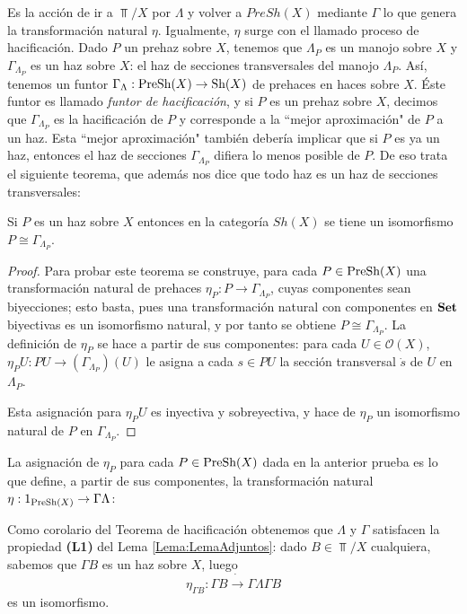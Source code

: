Es la acción de ir a $\Top/X$ por $\Lambda$ y volver a $PreSh(X)$ mediante $\Gamma$ lo que genera la transformación natural $\eta$. Igualmente, $\eta$ surge con el llamado proceso de hacificación. Dado $P$ un prehaz sobre $X$, tenemos que $\Lambda_P$ es un manojo sobre $X$ y $\Gamma_{\Lambda_P}$ es un haz sobre $X$: el haz de secciones transversales del manojo $\Lambda_P$. Así, tenemos un funtor $\Gamma_\Lambda: \normalfont{\text{PreSh}}(X)\to\normalfont{\text{Sh}}(X)$ de prehaces en haces sobre $X$. Éste funtor es llamado \textit{funtor de hacificación}, y si $P$ es un prehaz sobre $X$, decimos que $\Gamma_{\Lambda_P}$ es la hacificación de $P$ y corresponde a la ``mejor aproximación" de $P$ a un haz. Esta ``mejor aproximación" también debería implicar que si $P$ es ya un haz, entonces el haz de secciones $\Gamma_{\Lambda_P}$ difiera lo menos posible de $P$. De eso trata el siguiente teorema, que además nos dice que todo haz es un haz de secciones transversales:
\begin{Tma}
   Si $P$ es un haz sobre $X$ entonces en la categoría $Sh(X)$ se tiene un isomorfismo $P\cong \Gamma_{\Lambda_P}$.
\end{Tma}
\begin{proof}
   Para probar este teorema se construye, para cada $P\in \normalfont{\text{PreSh}}(X)$ una transformación natural de prehaces $\eta_{P}:P\to\Gamma_{\Lambda_P}$, cuyas componentes sean biyecciones; esto basta, pues una transformación natural con componentes en $\normalfont{\textbf{Set}}$ biyectivas es un isomorfismo natural, y por tanto se obtiene $P\cong \Gamma_{\Lambda_P}$. La definición de $\eta_P$ se hace a partir de sus componentes: para cada $U\in \mathcal{O}(X)$, $\eta_{P} U:PU\to (\Gamma_{\Lambda_P})(U)$ le asigna a cada $s\in PU$ la sección transversal $\dot{s}$ de $U$ en $\Lambda_P$.
   
   Esta asignación para $\eta_{P}U$ es inyectiva y sobreyectiva, y hace de $\eta_P$ un isomorfismo natural de $P$ en $\Gamma_{\Lambda_P}$.
\end{proof}
La asignación de $\eta_P$ para cada $P\in \normalfont{\text{PreSh}} (X)$ dada en la anterior prueba es lo que define, a partir de sus componentes, la transformación natural $\eta :1_{\normalfont{\text{PreSh}}(X)}\to \Gamma \Lambda$:

Como corolario del Teorema de hacificación obtenemos que $\Lambda$ y $\Gamma$ satisfacen la propiedad \textbf{(L1)} del Lema \ref{Lema:LemaAdjuntos}: dado $B\in \Top/X$ cualquiera, sabemos que $\Gamma B$ es un haz sobre $X$, luego 
$$
   \eta_{\Gamma B}:\Gamma B\dot{\to}\Gamma \Lambda \Gamma B
$$
es un isomorfismo. 
